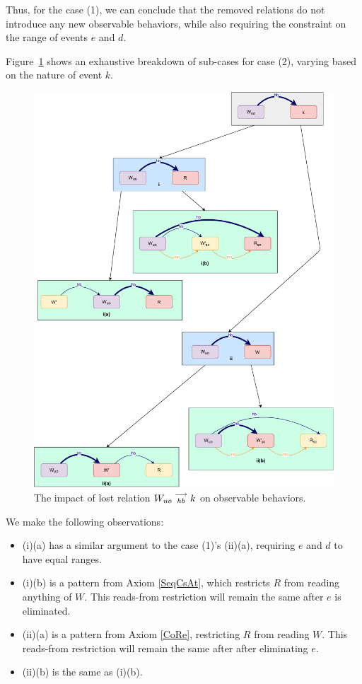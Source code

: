     Thus, for the case (1), we can conclude that the removed relations do not introduce any new observable behaviors, while also requiring the constraint on the range of events $e$ and $d$.

    Figure~\ref{elim_write:case2} shows an exhaustive breakdown of sub-cases for case (2), varying based
    on the nature of event $k$.
    \begin{figure}[H]
        \centering
        \includegraphics[scale=0.6]{5.Elimination/1.ValidEliminationCandidate/WriteElimProof/ProofParts/Part4Case2.pdf}
        \caption{The impact of lost relation $W_{uo}\stackrel{\longrightarrow}{_{hb}}k$ on observable behaviors.}
        \label{elim_write:case2}
    \end{figure}

    We make the following observations:
    \begin{itemize}
        \item (i)(a) has a similar argument to the case (1)'s (ii)(a), requiring $e$ and $d$ to have equal ranges.
        \item (i)(b) is a pattern from Axiom \ref{SeqCsAt}, which restricts $R$ from reading anything of $W$. This reads-from restriction will remain the same after $e$ is eliminated. 
        \item (ii)(a) is a pattern from Axiom \ref{CoRe}, restricting $R$ from reading $W$. This reads-from restriction will remain the same after after eliminating $e$.
        \item (ii)(b) is the same as (i)(b).
    \end{itemize}

